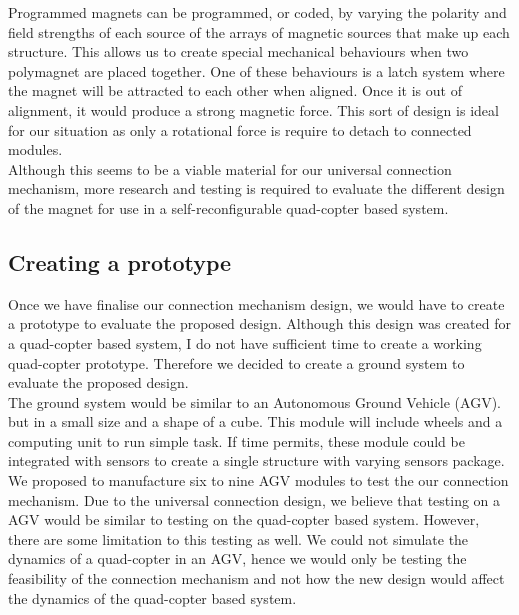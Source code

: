 \documentclass[12pt,A4]{article}
\begin{document}
	Programmed magnets can be programmed, or coded, by varying the polarity and field strengths of each source of the arrays of magnetic sources that make up each structure. This allows us to create special mechanical behaviours when two polymagnet are placed together. One of these behaviours is a latch system where the magnet will be attracted to each other when aligned. Once it is out of alignment, it would produce a strong magnetic force. This sort of design is ideal for our situation as only a rotational force is require to detach to connected modules.\\
	
	Although this seems to be a viable material for our universal connection mechanism, more research and testing is required to evaluate the different design of the magnet for use in a self-reconfigurable quad-copter based system.\\
	
	\subsection{Creating a prototype}
	
	Once we have finalise our connection mechanism design, we would have to create a prototype to evaluate the proposed design. Although this design was created for a quad-copter based system, I do not have sufficient time to create a working quad-copter prototype. Therefore we decided to create a ground system to evaluate the proposed design.\\
	
	The ground system would be similar to an Autonomous Ground Vehicle (AGV). but in a small size and a shape of a cube. This module will include wheels and a computing unit to run simple task. If time permits, these module could be integrated with sensors to create a single structure with varying sensors package.\\
	
	We proposed to manufacture six to nine AGV modules to test the our connection mechanism. Due to the universal connection design, we believe that testing on a AGV would be similar to testing on the quad-copter based system. However, there are some limitation to this testing as well. We could not simulate the dynamics of a quad-copter in an AGV, hence we would only be testing the feasibility of the connection mechanism and not how the new design would affect the dynamics of the quad-copter based system.\\
	
\end{document}

